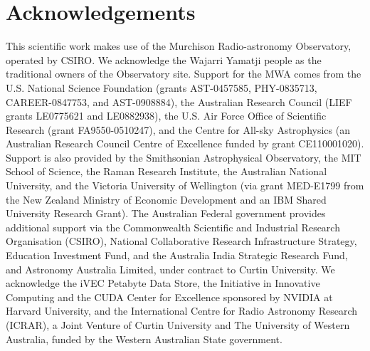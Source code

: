 \documentclass{pasa}
\DeclareRobustCommand{\TUSSEN}[3]{#2}
\begin{document}
\section*{Acknowledgements}
This scientific work makes use of the Murchison Radio-astronomy Observatory, operated by CSIRO. We acknowledge the Wajarri Yamatji people as the traditional owners of the Observatory site. Support for the MWA comes from the U.S. National Science Foundation (grants AST-0457585, PHY-0835713, CAREER-0847753, and AST-0908884), the Australian Research Council (LIEF grants LE0775621 and LE0882938), the U.S. Air Force Office of Scientific Research (grant FA9550-0510247), and the Centre for All-sky Astrophysics (an Australian Research Council Centre of Excellence funded by grant CE110001020). Support is also provided by the Smithsonian Astrophysical Observatory, the MIT School of Science, the Raman Research Institute, the Australian National University, and the Victoria University of Wellington (via grant MED-E1799 from the New Zealand Ministry of Economic Development and an IBM Shared University Research Grant). The Australian Federal government provides additional support via the Commonwealth Scientific and Industrial Research Organisation (CSIRO), National Collaborative Research Infrastructure Strategy, Education Investment Fund, and the Australia India Strategic Research Fund, and Astronomy Australia Limited, under contract to Curtin University. We acknowledge the iVEC Petabyte Data Store, the Initiative in Innovative Computing and the CUDA Center for Excellence sponsored by NVIDIA at Harvard University, and the International Centre for Radio Astronomy Research (ICRAR), a Joint Venture of Curtin University and The University of Western Australia, funded by the Western Australian State government. 

\DeclareRobustCommand{\TUSSEN}[3]{#3}



\label{lastpage}
\end{document}

